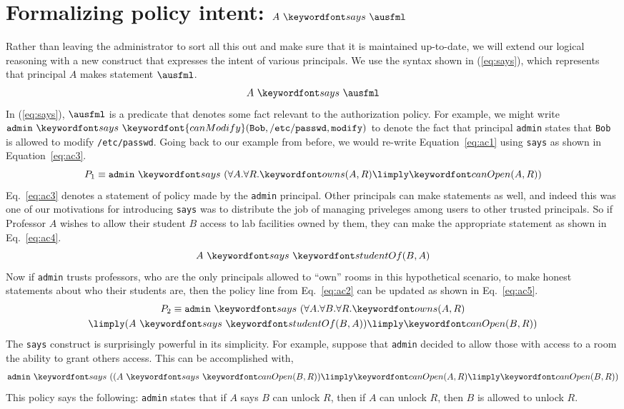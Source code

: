 \documentclass[11pt,twoside]{scrartcl}
\begin{document}
\section{Formalizing policy intent: $\says{A}{\ausfml}$}

Rather than leaving the administrator to sort all this out and make sure that it is maintained up-to-date, we will extend our logical reasoning with a new construct that expresses the intent of various principals. We use the syntax shown in (\ref{eq:says}), which represents that principal $A$ makes statement $\ausfml$.
\begin{equation}
\label{eq:says}
\says{A}{\ausfml}
\end{equation}
In (\ref{eq:says}), $\ausfml$ is a predicate that denotes some fact relevant to the authorization policy. For example, we might write $\says{\mathtt{admin}}{\keywordfont{canModify}(\mathtt{Bob},\mathtt{/etc/passwd},\mathtt{modify})}$ to denote the fact that principal \verb'admin' states that \verb'Bob' is allowed to modify \verb'/etc/passwd'. Going back to our example from before, we would re-write Equation~\ref{eq:ac1} using \verb'says' as shown in Equation~\ref{eq:ac3}.
\begin{equation}
\label{eq:ac3}
P_1 \equiv \says{\mathtt{admin}}{(\forall A.\forall R. \ownsr(A,R) \limply \canopen(A,R))}
\end{equation}
Eq.~\ref{eq:ac3} denotes a statement of policy made by the \verb'admin' principal. Other principals can make statements as well, and indeed this was one of our motivations for introducing \verb'says' was to distribute the job of managing priveleges among users to other trusted principals. So if Professor $A$ wishes to allow their student $B$ access to lab facilities owned by them, they can make the appropriate statement as shown in Eq.~\ref{eq:ac4}.
\begin{equation}
\label{eq:ac4}
\says{A}{\studof(B,A)}
\end{equation}
Now if \verb'admin' trusts professors, who are the only principals allowed to ``own'' rooms in this hypothetical scenario, to make honest statements about who their students are, then the policy line from Eq.~\ref{eq:ac2} can be updated as shown in Eq.~\ref{eq:ac5}.
\begin{multline}
\label{eq:ac5}
P_2 \equiv \says{\mathtt{admin}}{(\forall A.\forall B.\forall R. \ownsr(A,R) \\ \limply (\says{A}{\studof(B,A)}) \limply \canopen(B,R))}
\end{multline}
The \verb'says' construct is surprisingly powerful in its simplicity. For example, suppose that \verb'admin' decided to allow those with access to a room the ability to grant others access. This can be accomplished with,
\begin{multline}
\says{\mathtt{admin}}{((\says{A}{\canopen(B,R)}) \limply \canopen(A,R) \limply \canopen(B,R))}
\end{multline}
This policy says the following: \verb'admin' states that if $A$ says $B$ can unlock $R$, then if $A$ can unlock $R$, then $B$ is allowed to unlock $R$.
\end{document}

